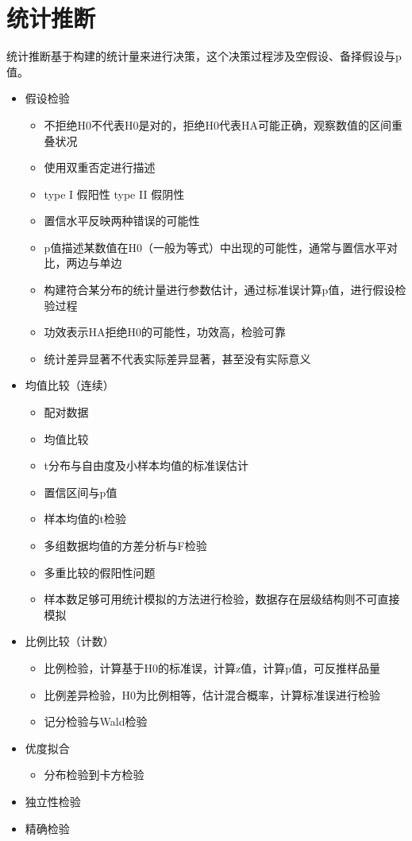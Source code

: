 \documentclass[]{book}
\providecommand{\tightlist}{%
  \setlength{\itemsep}{0pt}\setlength{\parskip}{0pt}}
\begin{document}
\hypertarget{si}{%
\section{统计推断}\label{si}}

统计推断基于构建的统计量来进行决策，这个决策过程涉及空假设、备择假设与p值。

\begin{itemize}
\item
  假设检验

  \begin{itemize}
  \tightlist
  \item
    不拒绝H0不代表H0是对的，拒绝H0代表HA可能正确，观察数值的区间重叠状况
  \item
    使用双重否定进行描述
  \item
    type I 假阳性 type II 假阴性
  \item
    置信水平反映两种错误的可能性
  \item
    p值描述某数值在H0（一般为等式）中出现的可能性，通常与置信水平对比，两边与单边
  \item
    构建符合某分布的统计量进行参数估计，通过标准误计算p值，进行假设检验过程
  \item
    功效表示HA拒绝H0的可能性，功效高，检验可靠
  \item
    统计差异显著不代表实际差异显著，甚至没有实际意义
  \end{itemize}
\item
  均值比较（连续）

  \begin{itemize}
  \tightlist
  \item
    配对数据
  \item
    均值比较
  \item
    t分布与自由度及小样本均值的标准误估计
  \item
    置信区间与p值
  \item
    样本均值的t检验
  \item
    多组数据均值的方差分析与F检验
  \item
    多重比较的假阳性问题
  \item
    样本数足够可用统计模拟的方法进行检验，数据存在层级结构则不可直接模拟
  \end{itemize}
\item
  比例比较（计数）

  \begin{itemize}
  \tightlist
  \item
    比例检验，计算基于H0的标准误，计算z值，计算p值，可反推样品量
  \item
    比例差异检验，H0为比例相等，估计混合概率，计算标准误进行检验
  \item
    记分检验与Wald检验
  \end{itemize}
\item
  优度拟合

  \begin{itemize}
  \tightlist
  \item
    分布检验到卡方检验
  \end{itemize}
\item
  独立性检验
\item
  精确检验
\end{itemize}
\end{document}
